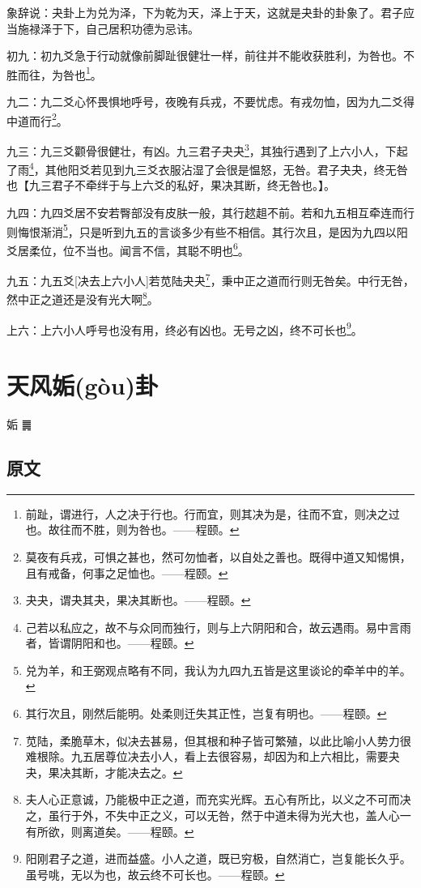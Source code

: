 \documentclass[12pt,oneside]{book}
\begin{document}
象辞说：夬卦上为兑为泽，下为乾为天，泽上于天，这就是夬卦的卦象了。君子应当施禄泽于下，自己居积功德为忌讳。

初九：初九爻急于行动就像前脚趾很健壮一样，前往并不能收获胜利，为咎也。不胜而往，为咎也\footnote{前趾，谓进行，人之决于行也。行而宜，则其决为是，往而不宜，则决之过也。故往而不胜，则为咎也。——程颐。}。

九二：九二爻心怀畏惧地呼号，夜晚有兵戎，不要忧虑。有戎勿恤，因为九二爻得中道而行\footnote{莫夜有兵戎，可惧之甚也，然可勿恤者，以自处之善也。既得中道又知惕惧，且有戒备，何事之足恤也。——程颐。}。

九三：九三爻颧骨很健壮，有凶。九三君子夬夬\footnote{夬夬，谓夬其夬，果决其断也。——程颐。}，其独行遇到了上六小人，下起了雨\footnote{己若以私应之，故不与众同而独行，则与上六阴阳和合，故云遇雨。易中言雨者，皆谓阴阳和也。——程颐。}，其他阳爻若见到九三爻衣服沾湿了会很是愠怒，无咎。君子夬夬，终无咎也【九三君子不牵绊于与上六爻的私好，果决其断，终无咎也。】。

九四：九四爻居不安若臀部没有皮肤一般，其行趑趄不前。若和九五相互牵连而行则悔恨渐消\footnote{兑为羊，和王弼观点略有不同，我认为九四九五皆是这里谈论的牵羊中的羊。}，只是听到九五的言谈多少有些不相信。其行次且，是因为九四以阳爻居柔位，位不当也。闻言不信，其聪不明也\footnote{其行次且，刚然后能明。处柔则迁失其正性，岂复有明也。——程颐。}。

九五：九五爻[决去上六小人]若苋陆夬夬\footnote{苋陆，柔脆草木，似决去甚易，但其根和种子皆可繁殖，以此比喻小人势力很难根除。九五居尊位决去小人，看上去很容易，却因为和上六相比，需要夬夬，果决其断，才能决去之。}，秉中正之道而行则无咎矣。中行无咎，然中正之道还是没有光大啊\footnote{夫人心正意诚，乃能极中正之道，而充实光辉。五心有所比，以义之不可而决之，虽行于外，不失中正之义，可以无咎，然于中道未得为光大也，盖人心一有所欲，则离道矣。——程颐。}。

上六：上六小人呼号也没有用，终必有凶也。无号之凶，终不可长也\footnote{阳刚君子之道，进而益盛。小人之道，既已穷极，自然消亡，岂复能长久乎。虽号咷，无以为也，故云终不可长也。——程颐。}。



\chapter{天风姤(gòu)卦}
姤 {\Large ䷫}

\section{原文}
\end{document}
